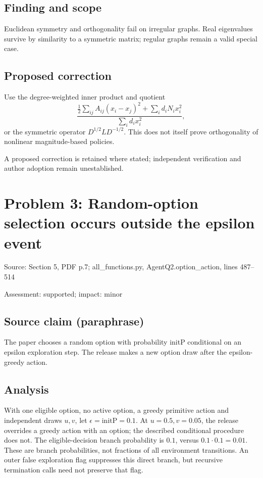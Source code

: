 \documentclass[11pt]{article}
\begin{document}
\subsection*{Finding and scope}

Euclidean symmetry and orthogonality fail on irregular graphs. Real eigenvalues survive by similarity to a symmetric matrix; regular graphs remain a valid special case.

\subsection*{Proposed correction}

Use the degree-weighted inner product and quotient \[\frac{\tfrac12\sum_{ij}A_{ij}(x_i-x_j)^2+\sum_i d_iN_ix_i^2}{\sum_i d_ix_i^2},\] or the symmetric operator \(D^{1/2}LD^{-1/2}\). This does not itself prove orthogonality of nonlinear magnitude-based policies.

A proposed correction is retained where stated; independent verification and author adoption remain unestablished.

\section*{Problem 3: Random-option selection occurs outside the epsilon event}

Source: Section 5, PDF p.7; all\_functions.py, AgentQ2.option\_action, lines 487–514

Assessment: supported; impact: minor

\subsection*{Source claim (paraphrase)}

The paper chooses a random option with probability initP conditional on an epsilon exploration step. The release makes a new option draw after the epsilon-greedy action.

\subsection*{Analysis}

With one eligible option, no active option, a greedy primitive action and independent draws \(u,v\), let \(\epsilon=\mathrm{initP}=0.1\). At \(u=0.5,v=0.05\), the release overrides a greedy action with an option; the described conditional procedure does not. The eligible-decision branch probability is \(0.1\), versus \(0.1\cdot0.1=0.01\). These are branch probabilities, not fractions of all environment transitions. An outer false exploration flag suppresses this direct branch, but recursive termination calls need not preserve that flag.
\end{document}
